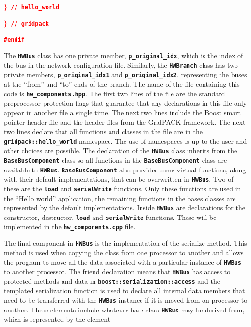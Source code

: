 \documentclass[12pt]{report} %
\begin{document}
\textcolor{red}{\texttt{\textbf{$\boldsymbol{\mathrm{\}}}$     // hello\_world}}}

\textcolor{red}{\texttt{\textbf{$\boldsymbol{\mathrm{\}}}$     // gridpack}}}

\textcolor{red}{\texttt{\textbf{\#endif}}}

The \texttt{\textbf{HWBus}} class has one private member, \texttt{\textbf{p\_original\_idx}}, which is the index of the bus in the network configuration file. Similarly, the \texttt{\textbf{HWBranch}} class has two private members, \texttt{\textbf{p\_original\_idx1}} and \texttt{\textbf{p\_original\_idx2}}, representing the buses at the ``from'' and ``to'' ends of the branch. The name of the file containing this code is \texttt{\textbf{hw\_components.hpp}}. The first two lines of the file are the standard preprocessor protection flags that guarantee that any declarations in this file only appear in another file a single time. The next two lines include the Boost smart pointer header file and the header files from the GridPACK framework. The next two lines declare that all functions and classes in the file are in the \texttt{\textbf{gridpack::hello\_world}} namespace. The use of namespaces is up to the user and other choices are possible. The declaration of the \texttt{\textbf{HWBus}} class inherits from the \texttt{\textbf{BaseBusComponent}} class so all functions in the \texttt{\textbf{BaseBusComponent}} class are available to \texttt{\textbf{HWBus}}. \texttt{\textbf{BaseBusComponent}} also provides some virtual functions, along with their default implementations, that can be overwritten in \texttt{\textbf{HWBus}}. Two of these are the \texttt{\textbf{load}} and \texttt{\textbf{serialWrite}} functions. Only these functions are used in the ``Hello world'' application, the remaining functions in the bases classes are represented by the default implementations. Inside \texttt{\textbf{HWBus}} are declarations for the constructor, destructor, \texttt{\textbf{load}} and \texttt{\textbf{serialWrite}} functions. These will be implemented in the \texttt{\textbf{hw\_components.cpp}} file.

The final component in \texttt{\textbf{HWBus}} is the implementation of the serialize method. This method is used when copying the class from one processor to another and allows the program to move all the data associated with a particular instance of \texttt{\textbf{HWBus}} to another processor. The friend declaration means that \texttt{\textbf{HWBus}} has access to protected methods and data in \texttt{\textbf{boost::serialization::access}} and the templated serialization function is used to declare all internal data members that need to be transferred with the \texttt{\textbf{HWBus}} instance if it is moved from on processor to another. These elements include whatever base class \texttt{\textbf{HWBus}} may be derived from, which is represented by the element
\end{document}
